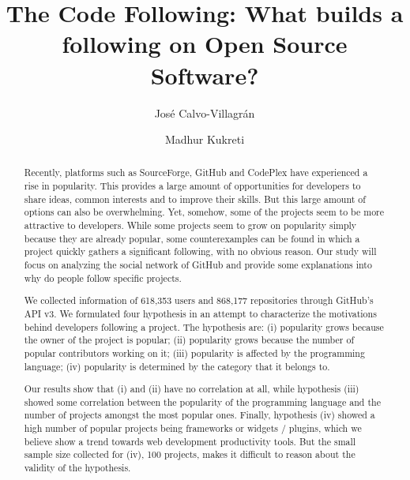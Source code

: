 \documentclass{acm_proc_article-sp}
\begin{document}
\title{The Code Following: What builds a following on Open Source Software?}
\author{
\alignauthor
Jos{\'e} Calvo-Villagr{\'a}n
\and
\alignauthor
Madhur Kukreti
}

\maketitle

\begin{abstract}
Recently, platforms such as SourceForge, GitHub and CodePlex have experienced a rise in popularity. This provides a large amount of opportunities for developers to share ideas, common interests and to improve their skills. But this large amount of options can also be overwhelming. Yet, somehow, some of the projects seem to be more attractive to developers. While some projects seem to grow on popularity simply because they are already popular, some counterexamples can be found in which a project quickly gathers a significant following, with no obvious reason. Our study will focus on analyzing the social network of GitHub and provide some explanations into why do people follow specific projects.

We collected information of 618,353 users and 868,177 repositories through GitHub's API v3. We formulated four hypothesis in an attempt to characterize the motivations behind developers following a project. The hypothesis are: (i) popularity grows because the owner of the project is popular; (ii) popularity grows because the number of popular contributors working on it; (iii) popularity is affected by the programming language; (iv) popularity is determined by the category that it belongs to.

Our results show that (i) and (ii) have no correlation at all, while hypothesis (iii) showed some correlation between the popularity of the programming language and the number of projects amongst the most popular ones. Finally, hypothesis (iv) showed a high number of popular projects being frameworks or widgets / plugins, which we believe show a trend towards web development productivity tools. But the small sample size collected for (iv), 100 projects, makes it difficult to reason about the validity of the hypothesis.
\end{abstract}













\end{document}
